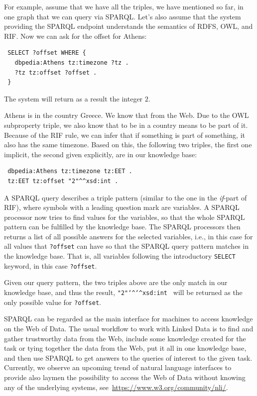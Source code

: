 For example, assume that we have all the triples, we have mentioned so far, in one graph that we can query via SPARQL.
Let's also assume that the system providing the SPARQL endpoint understands the semantics of RDFS, OWL, and RIF.
Now we can ask for the offset for Athens:

\begin{verbatim}
 SELECT ?offset WHERE {
   dbpedia:Athens tz:timezone ?tz .
   ?tz tz:offset ?offset .
 }
\end{verbatim}

The system will return as a result the integer $2$.

Athens is in the country Greece. We know that from the Web.
Due to the OWL subproperty triple, we also know that to be in a country means to be part of it.
Because of the RIF rule, we can infer that if something is part of something, it also has the same timezone.
Based on this, the following two triples, the first one implicit, the second given explicitly, are in our knowledge base:

\begin{verbatim}
 dbpedia:Athens tz:timezone tz:EET .
 tz:EET tz:offset "2"^^xsd:int .
\end{verbatim}

A SPARQL query describes a triple pattern (similar to the one in the \textit{if}-part of RIF),
where symbols with a leading question mark are variables.
A SPARQL processor now tries to find values for the variables, so that the whole SPARQL pattern can be fulfilled by the knowledge base.
The SPARQL processors then returns a list of all possible answers for the selected variables, i.e., in this case for all values that \texttt{?offset} can have so that the SPARQL query pattern matches in the knowledge base.
That is, all variables following the introductory \texttt{SELECT} keyword, in this case \texttt{?offset}.

Given our query pattern, the two triples above are the only match in our knowledge base, and thus the result, \texttt{"2"\texttt{\char`\^}\texttt{\char`\^}xsd:int } will be returned as the only possible value for \texttt{?offset}.

SPARQL can be regarded as the main interface for machines to access knowledge on the Web of Data.
The usual workflow to work with Linked Data is to find and gather trustworthy data from the Web, include some knowledge created for the task or tying together the data from the Web, put it all in one knowledge base, and then use SPARQL to get answers to the queries of interest to the given task.
Currently, we observe an upcoming trend of natural language interfaces to provide also laymen the possibility to access the Web of Data without knowing any of the underlying systems, see~\url{https://www.w3.org/community/nli/}.

